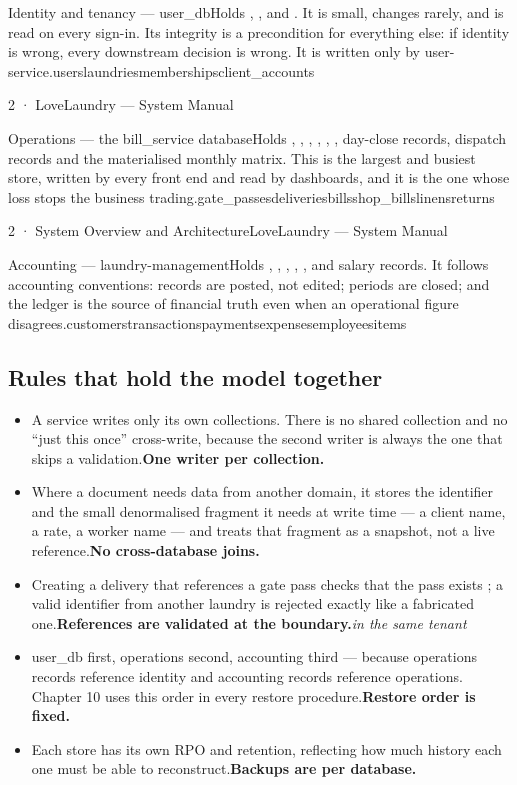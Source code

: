 \documentclass[11pt,a4paper,oneside]{book}
\begin{document}
Identity and tenancy — user\_dbHolds , , and . It is small, changes rarely, and is read on every sign-in. Its integrity is a precondition for everything else: if identity is wrong, every downstream decision is wrong. It is written only by user-service.userslaundriesmembershipsclient\_accounts

2 · LoveLaundry — System Manual

Operations — the bill\_service databaseHolds , , , , , , day-close records, dispatch records and the materialised monthly matrix. This is the largest and busiest store, written by every front end and read by dashboards, and it is the one whose loss stops the business trading.gate\_passesdeliveriesbillsshop\_billslinensreturns

2 · System Overview and ArchitectureLoveLaundry — System Manual

Accounting — laundry-managementHolds , , , , , and salary records. It follows accounting conventions: records are posted, not edited; periods are closed; and the ledger is the source of financial truth even when an operational figure disagrees.customerstransactionspaymentsexpensesemployeesitems

\subsection*{Rules that hold the model together}
\begin{itemize}
\item A service writes only its own collections. There is no shared collection and no “just this once” cross-write, because the second writer is always the one that skips a validation.\textbf{One writer per collection.}
\item Where a document needs data from another domain, it stores the identifier and the small denormalised fragment it needs at write time — a client name, a rate, a worker name — and treats that fragment as a snapshot, not a live reference.\textbf{No cross-database joins.}
\item Creating a delivery that references a gate pass checks that the pass exists ; a valid identifier from another laundry is rejected exactly like a fabricated one.\textbf{References are validated at the boundary.}\emph{in the same tenant}
\item user\_db first, operations second, accounting third — because operations records reference identity and accounting records reference operations. Chapter 10 uses this order in every restore procedure.\textbf{Restore order is fixed.}
\item Each store has its own RPO and retention, reflecting how much history each one must be able to reconstruct.\textbf{Backups are per database.}
\end{itemize}
\end{document}

